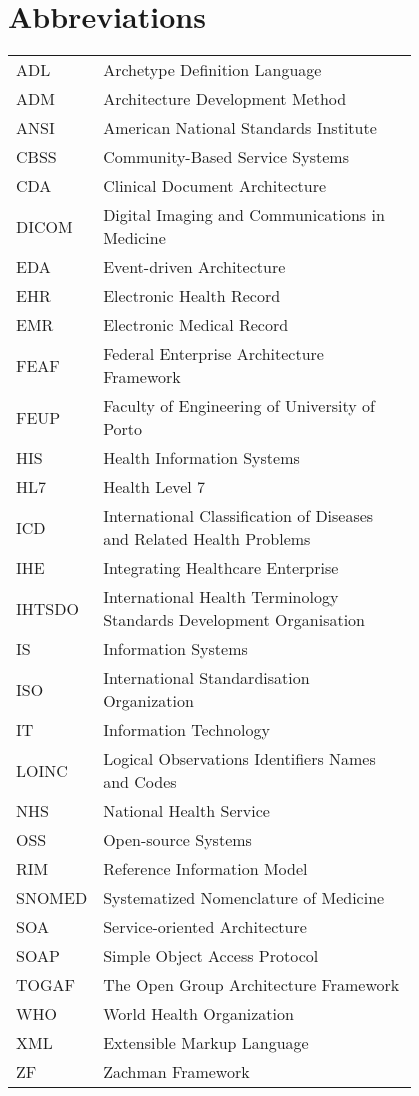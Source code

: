 \chapter*{Abbreviations}

\begin{flushleft}
\begin{tabular}{l p{0.8\linewidth}}
ADL		& Archetype Definition Language \\
ADM		& Architecture Development Method \\
ANSI	& American National Standards Institute \\
CBSS	& Community-Based Service Systems \\
CDA		& Clinical Document Architecture \\
DICOM	& Digital Imaging and Communications in Medicine \\
EDA		& Event-driven Architecture \\
EHR		& Electronic Health Record \\
EMR		& Electronic Medical Record \\
FEAF	& Federal Enterprise Architecture Framework \\
FEUP	& Faculty of Engineering of University of Porto \\
HIS		& Health Information Systems \\
HL7		& Health Level 7 \\
ICD		& International Classification of Diseases and Related Health Problems \\
IHE		& Integrating Healthcare Enterprise \\
IHTSDO  & International Health Terminology Standards Development Organisation \\
IS		& Information Systems \\
ISO		& International Standardisation Organization \\
IT		& Information Technology \\
LOINC   & Logical Observations Identifiers Names and Codes \\
NHS		& National Health Service \\
OSS		& Open-source Systems \\
RIM		& Reference Information Model \\
SNOMED	& Systematized Nomenclature of Medicine \\
SOA		& Service-oriented Architecture \\
SOAP	& Simple Object Access Protocol \\
TOGAF   & The Open Group Architecture Framework \\
WHO		& World Health Organization \\
XML	    & Extensible Markup Language \\
ZF		& Zachman Framework 
\end{tabular}
\end{flushleft}

